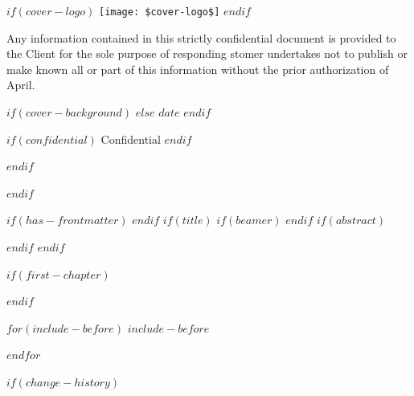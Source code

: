 \documentclass[
$if(fontsize)$
  $fontsize$,
$endif$
$if(papersize)$
  $papersize$paper,
$else$
  paper=a4,
$endif$
$if(beamer)$
  ignorenonframetext,
$if(handout)$
  handout,
$endif$
$if(aspectratio)$
  aspectratio=$aspectratio$,
$endif$
$endif$
$for(classoption)$
  $classoption$$sep$,
$endfor$
  ,captions=tableheading
]{$if(beamer)$$documentclass$$else$$if(book)$scrbook$else$scrartcl$endif$$endif$}
\begin{document}
\begin{titlepage}
\begin{center}
		$if(cover-logo)$
		\noindent
		\texttt{[image: \$cover-logo\$]}
		$endif$
	\end{center}

  {
    \color{primarycolor}
    \begin{flushleft}
    \textsf{Any information contained in this strictly confidential document is provided to the Client for the sole purpose of responding stomer undertakes
     not to publish or make known all or part of this information without the prior authorization of April.}
    \end{flushleft}
  }
  \vspace*{\fill}
	\begin{center}
		$if(cover-background)$
		$else$
		\textsf{$date$}
		$endif$

		$if(confidential)$
      \color{april}
      {Confidential}
    $endif$
	\end{center}
\end{titlepage}
$endif$


\color{primarycolor}

\restoregeometry
{}
$endif$


$if(has-frontmatter)$
\frontmatter
$endif$
$if(title)$
$if(beamer)$
\frame{\titlepage}
$endif$
$if(abstract)$
\begin{abstract}
	$abstract$
\end{abstract}
$endif$
$endif$

$if(first-chapter)$
\setcounter{chapter}{$first-chapter$}
\addtocounter{chapter}{-1}
$endif$

$for(include-before)$
$include-before$

$endfor$

$if(change-history)$
\end{document}
